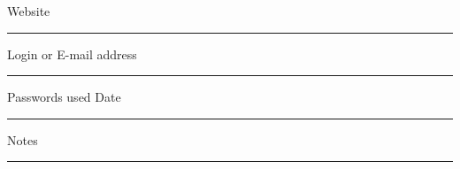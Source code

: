 \clearpage

\large

\noindent Website \
\vspace{-.125in} \\ \rule{\textwidth}{.6pt}
\vspace{0.175in}

\noindent Login or E-mail address \
\vspace{-.125in} \\ \rule{\textwidth}{.6pt}
\vspace{0.175in}

\noindent Passwords used
\hspace{1.7in}
Date \
\vspace{-.125in} \\ \rule{\textwidth}{.6pt}
\vspace{1.6in}

\noindent Notes \
\vspace{-.125in} \\ \rule{\textwidth}{.6pt}

\normalsize
